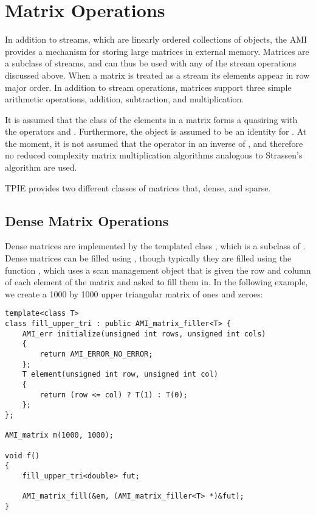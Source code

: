 \tobewritten

\section{Matrix Operations}
\label{sec:matrix}



In addition to streams, which are linearly ordered collections of objects,
the AMI provides a mechanism for storing large matrices in external memory.
Matrices are a subclass of streams, and can thus be used with any of the
stream operations discussed above.  When a matrix is treated as a stream
its elements appear in row major order.  In addition to stream operations,
matrices support three simple arithmetic operations, addition, subtraction,
and multiplication.

It is assumed that the class  of the elements in a matrix forms a
quasiring with the operators \myverb{+} and \myverb{*}.  Furthermore, the
object  is assumed to be an identity for \myverb{+}.  At the
moment, it is not assumed that the operator
\myverb{-} in an inverse of \myverb{+}, and therefore no reduced
complexity matrix multiplication algorithms analogous to Strassen's
algorithm are used.

TPIE provides two different classes of matrices that, dense, and sparse.


\subsection{Dense Matrix Operations}
\label{sec:dense-mat}


Dense matrices are implemented by the templated class
, which is a subclass
of . Dense matrices
can be filled using , though typically they are filled
using the function , which uses a scan management
object that is given the row and column of each element of the matrix and
asked to fill them in.  In the following example, we create a 1000 by 1000
upper triangular matrix of ones and zeroes:

\begin{verbatim}
template<class T>
class fill_upper_tri : public AMI_matrix_filler<T> {
    AMI_err initialize(unsigned int rows, unsigned int cols)
    {
        return AMI_ERROR_NO_ERROR;
    };
    T element(unsigned int row, unsigned int col)
    {
        return (row <= col) ? T(1) : T(0);
    };
};

AMI_matrix m(1000, 1000);

void f()
{
    fill_upper_tri<double> fut;

    AMI_matrix_fill(&em, (AMI_matrix_filler<T> *)&fut);
}
\end{verbatim}

